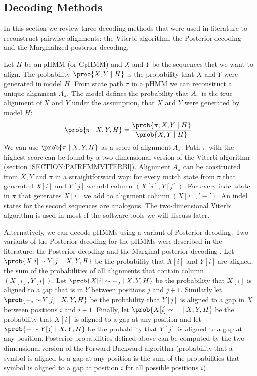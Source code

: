 \subsection{Decoding Methods}\label{SECTION:ALNDECODING}

In this section we review three decoding methods that were used in literature to
reconstruct pairwise alignments: the Viterbi algorithm, the Posterior
decoding and the Marginalized posterior decoding.

Let $H$ be an pHMM (or GpHMM) and $X$ and $Y$ be the sequences that we want to
align. The probability $\prob{X,Y\mid H}$ is the probability that $X$ and $Y$
were generated in model $H$.  From state path $\pi$ in a pHMM  we can
reconstruct a unique alignment $A_{\pi}$. The model defines the probability 
that
$A_{\pi}$ is the true alignment of $X$ and $Y$ under the assumption, that $X$ and $Y$ were
generated by model $H$:
  \[\prob{\pi\mid
X,Y,H}=\frac{\prob{\pi,X,Y\mid H}}{\prob{X,Y\mid H}}\]
  We can use $\prob{\pi\mid X,Y,H}$ as a score of 
alignment $A_{\pi}$. Path $\pi$ with the highest score can be found by a
two-dimensional version of the Viterbi
algorithm (section \ref{SECTION:PAIRHMMVITERBI}). Alignment $A_{\pi}$ can be
constructed from $X,Y$ and $\pi$ in a straightforward
way: for every match state from $\pi$ that generated $X[i]$ and $Y[j]$ we add
column $(X[i],Y[j])$. For every indel state in $\pi$ that generates $X[i]$ we
add to alignment column $(X[i],'-')$. An indel states for the second sequences are
analogous.  The two-dimensional Viterbi algorithm is used in  most of the
software tools we will discuss later.

Alternatively, we can decode pHMMs using a variant of Posterior decoding.  Two
variants of the Posterior decoding for the pHMMs were described in the
literature: the Posterior decoding and the Marginal posterior decoding
\cite{Lunter2008}.  Let $\prob{X[i]\sim Y[j]\mid X,Y,H}$ be the probability that
$X[i]$ and $Y[i]$ are aligned: the sum of the probabilities of all alignments
that
contain column $(X[i],Y[i])$. Let $\prob{X[i]\sim -_j\mid X,Y,H}$ be the
probability that $X[i]$ is aligned to a gap that is in $Y$ between positions $j$
and $j+1$. Similarly let $\prob{-_i\sim Y[j]\mid X,Y,H}$ be the probability that $Y[j]$
is aligned to a gap in $X$ between positions $i$ and $i+1$. Finally, let
$\prob{X[i]\sim - \mid X,Y,H}$ be the probability that $X[i]$ is aligned to a
gap at any position and let $\prob{-\sim Y[j]\mid X,Y,H}$ be the probability
that $Y[j]$ is aligned to a gap at any position.  Posterior probabilities
defined above can be computed by the two-dimensional version of the
Forward-Backward algorithm (probability that a symbol is aligned to a gap at any position
is the sum of the probabilities that symbol is aligned to a gap at position $i$
for all possible positions $i$).

